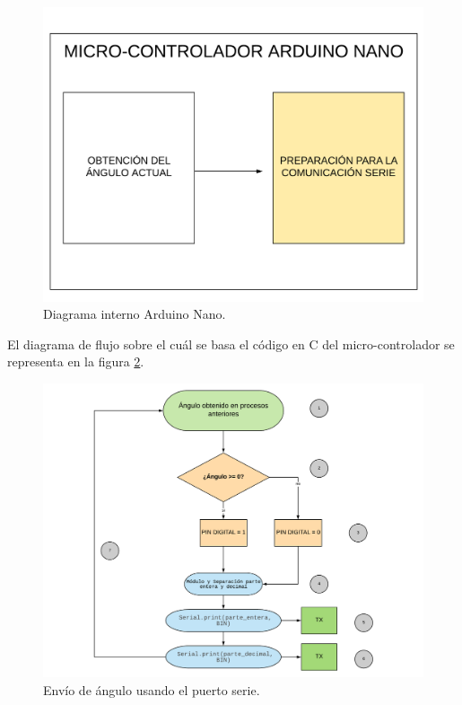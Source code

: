 \begin{figure}[H]
	\center
	\includegraphics[trim = 0mm 0mm 0mm 0mm, clip,scale=0.3]{imagenes/Balancing_robot/coexistencia3.pdf}
	\caption{Diagrama interno Arduino Nano.}
	\label{fig:coexistencia3}
\end{figure}

El diagrama de flujo sobre el cuál se basa el código en C del micro-controlador se representa en la figura \ref{fig:extraccion_angulo}.

\begin{figure}[H]
	\center
	\includegraphics[trim = 0mm 0mm 0mm 0mm, clip,scale=0.7]{imagenes/Balancing_robot/extraccion_angulo.pdf}
	\caption{Envío de ángulo usando el puerto serie.}
	\label{fig:extraccion_angulo}
\end{figure}

